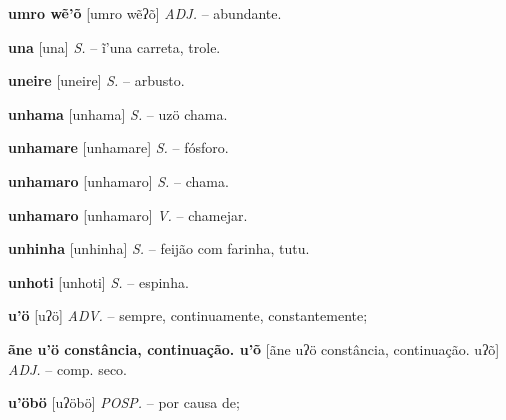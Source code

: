 \textbf{umro wẽ'õ} [umro wẽʔõ] \textit{ADJ.} -- abundante.

\textbf{una} [una] \textit{S.} -- ĩ'una carreta, trole.

\textbf{uneire} [uneire] \textit{S.} -- arbusto.

\textbf{unhama} [unhama] \textit{S.} -- uzö chama.

\textbf{unhamare} [unhamare] \textit{S.} -- fósforo.

\textbf{unhamaro} [unhamaro] \textit{S.} -- chama.

\textbf{unhamaro} [unhamaro] \textit{V.} -- chamejar.

\textbf{unhinha} [unhinha] \textit{S.} -- feijão com farinha, tutu.

\textbf{unhoti} [unhoti] \textit{S.} -- espinha.

\textbf{u'ö} [uʔö] \textit{ADV.} -- sempre, continuamente, constantemente;

\textbf{ãne u'ö constância, continuação. u'õ} [ãne uʔö constância, continuação. uʔõ] \textit{ADJ.} -- comp. seco.

\textbf{u'öbö} [uʔöbö] \textit{POSP.} -- por causa de;

